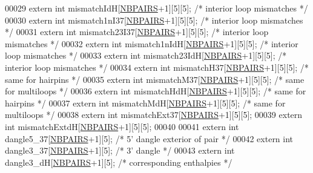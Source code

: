\begin{DoxyCode}
00029 \textcolor{keyword}{extern} \textcolor{keywordtype}{int} mismatchIdH[\hyperlink{constants_8h_a5e75221c779d618eab81e096f37e32ce}{NBPAIRS}+1][5][5];  \textcolor{comment}{/* interior loop mismatches */}
00030 \textcolor{keyword}{extern} \textcolor{keywordtype}{int} mismatch1nI37[\hyperlink{constants_8h_a5e75221c779d618eab81e096f37e32ce}{NBPAIRS}+1][5][5];  \textcolor{comment}{/* interior loop mismatches */}
00031 \textcolor{keyword}{extern} \textcolor{keywordtype}{int} mismatch23I37[\hyperlink{constants_8h_a5e75221c779d618eab81e096f37e32ce}{NBPAIRS}+1][5][5];  \textcolor{comment}{/* interior loop mismatches */}
00032 \textcolor{keyword}{extern} \textcolor{keywordtype}{int} mismatch1nIdH[\hyperlink{constants_8h_a5e75221c779d618eab81e096f37e32ce}{NBPAIRS}+1][5][5];  \textcolor{comment}{/* interior loop mismatches */}
00033 \textcolor{keyword}{extern} \textcolor{keywordtype}{int} mismatch23IdH[\hyperlink{constants_8h_a5e75221c779d618eab81e096f37e32ce}{NBPAIRS}+1][5][5];  \textcolor{comment}{/* interior loop mismatches */}
00034 \textcolor{keyword}{extern} \textcolor{keywordtype}{int} mismatchH37[\hyperlink{constants_8h_a5e75221c779d618eab81e096f37e32ce}{NBPAIRS}+1][5][5];  \textcolor{comment}{/* same for hairpins */}
00035 \textcolor{keyword}{extern} \textcolor{keywordtype}{int} mismatchM37[\hyperlink{constants_8h_a5e75221c779d618eab81e096f37e32ce}{NBPAIRS}+1][5][5];  \textcolor{comment}{/* same for multiloops */}
00036 \textcolor{keyword}{extern} \textcolor{keywordtype}{int} mismatchHdH[\hyperlink{constants_8h_a5e75221c779d618eab81e096f37e32ce}{NBPAIRS}+1][5][5];  \textcolor{comment}{/* same for hairpins */}
00037 \textcolor{keyword}{extern} \textcolor{keywordtype}{int} mismatchMdH[\hyperlink{constants_8h_a5e75221c779d618eab81e096f37e32ce}{NBPAIRS}+1][5][5];  \textcolor{comment}{/* same for multiloops */}
00038 \textcolor{keyword}{extern} \textcolor{keywordtype}{int} mismatchExt37[\hyperlink{constants_8h_a5e75221c779d618eab81e096f37e32ce}{NBPAIRS}+1][5][5];
00039 \textcolor{keyword}{extern} \textcolor{keywordtype}{int} mismatchExtdH[\hyperlink{constants_8h_a5e75221c779d618eab81e096f37e32ce}{NBPAIRS}+1][5][5];
00040 
00041 \textcolor{keyword}{extern} \textcolor{keywordtype}{int} dangle5\_37[\hyperlink{constants_8h_a5e75221c779d618eab81e096f37e32ce}{NBPAIRS}+1][5];      \textcolor{comment}{/* 5' dangle exterior of pair */}
00042 \textcolor{keyword}{extern} \textcolor{keywordtype}{int} dangle3\_37[\hyperlink{constants_8h_a5e75221c779d618eab81e096f37e32ce}{NBPAIRS}+1][5];      \textcolor{comment}{/* 3' dangle */}
00043 \textcolor{keyword}{extern} \textcolor{keywordtype}{int} dangle3\_dH[\hyperlink{constants_8h_a5e75221c779d618eab81e096f37e32ce}{NBPAIRS}+1][5];       \textcolor{comment}{/* corresponding enthalpies */}

\end{DoxyCode}
